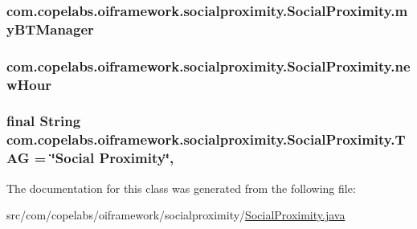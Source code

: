 \subsubsection[{my\+B\+T\+Manager}]{ com.\+copelabs.\+oiframework.\+socialproximity.\+Social\+Proximity.\+my\+B\+T\+Manager\hspace{0.3cm}{\ttfamily [private]}}\label{classcom_1_1copelabs_1_1oiframework_1_1socialproximity_1_1_social_proximity_a97e98caf9eac0a2361d325427166fb76}
\hypertarget{classcom_1_1copelabs_1_1oiframework_1_1socialproximity_1_1_social_proximity_aa4bff9fdacc2c0972cb658bdd969b696}{}
\subsubsection[{new\+Hour}]{ com.\+copelabs.\+oiframework.\+socialproximity.\+Social\+Proximity.\+new\+Hour\hspace{0.3cm}{\ttfamily [private]}}\label{classcom_1_1copelabs_1_1oiframework_1_1socialproximity_1_1_social_proximity_aa4bff9fdacc2c0972cb658bdd969b696}
\hypertarget{classcom_1_1copelabs_1_1oiframework_1_1socialproximity_1_1_social_proximity_a5c66e514f85322b5edac4ed87c7db4c5}{}
\subsubsection[{T\+A\+G}]{\setlength{\rightskip}{0pt plus 5cm}final String com.\+copelabs.\+oiframework.\+socialproximity.\+Social\+Proximity.\+T\+A\+G = \char`\"{}Social Proximity\char`\"{}\hspace{0.3cm}{\ttfamily [static]}, {\ttfamily [private]}}\label{classcom_1_1copelabs_1_1oiframework_1_1socialproximity_1_1_social_proximity_a5c66e514f85322b5edac4ed87c7db4c5}


The documentation for this class was generated from the following file\+:\begin{DoxyCompactItemize}
\item 
src/com/copelabs/oiframework/socialproximity/\hyperlink{_social_proximity_8java}{Social\+Proximity.\+java}\end{DoxyCompactItemize}
